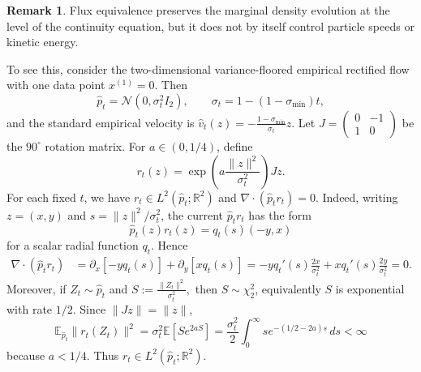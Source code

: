 \documentclass[a4paper,11pt]{article}
\theoremstyle{plain}
\theoremstyle{definition}
\newtheorem{remark}{Remark}[section]
\begin{document}
\begin{remark}
Flux equivalence preserves the marginal density evolution at the level of the
continuity equation, but it does not by itself control particle speeds or
kinetic energy.

To see this, consider the two-dimensional variance-floored empirical rectified
flow with one data point \(x^{(1)}=0\). Then
\[
    \hat p_t=\mathcal N(0,\sigma_t^2 I_2),
    \qquad
    \sigma_t=1-(1-\sigma_{\min})t,
\]
and the standard empirical velocity is
\(
    \hat v_t(z)
    =
    -\frac{1-\sigma_{\min}}{\sigma_t}z.
\)
Let
\(
    J=
    \begin{pmatrix}
        0 & -1 \\
        1 & 0
    \end{pmatrix}
\)
be the \(90^\circ\) rotation matrix. For \(a\in(0,1/4)\), define
\[
    r_t(z)
    =
    \exp\!\left(a\frac{\|z\|^2}{\sigma_t^2}\right)Jz.
\]
For each fixed \(t\), we have \(r_t\in L^2(\hat p_t;\mathbb R^2)\) and
\(
    \nabla\cdot(\hat p_t r_t)=0.
\)
Indeed, writing \(z=(x,y)\) and \(s=\|z\|^2/\sigma_t^2\), the current
\(\hat p_t r_t\) has the form
\[
    \hat p_t(z)r_t(z)
    =
    q_t(s)(-y,x)
\]
for a scalar radial function \(q_t\). Hence
\[
\begin{aligned}
    \nabla\cdot(\hat p_t r_t)
    &=
    \partial_x[-yq_t(s)]
    +
    \partial_y[xq_t(s)] =
    -yq_t'(s)\frac{2x}{\sigma_t^2}
    +
    xq_t'(s)\frac{2y}{\sigma_t^2}
    =
    0.
\end{aligned}
\]
Moreover, if \(Z_t\sim\hat p_t\) and
\(
    S:=\frac{\|Z_t\|^2}{\sigma_t^2},
\)
then \(S\sim\chi_2^2\), equivalently \(S\) is exponential with rate \(1/2\).
Since \(\|Jz\|=\|z\|\),
\[
    \mathbb E_{\hat p_t}\|r_t(Z_t)\|^2
    =
    \sigma_t^2\mathbb E\left[S e^{2aS}\right]
    =
    \frac{\sigma_t^2}{2}
    \int_0^\infty s e^{-(1/2-2a)s}\,ds
    <
    \infty
\]
because \(a<1/4\). Thus \(r_t\in L^2(\hat p_t;\mathbb R^2)\).


\end{remark}
\end{document}
